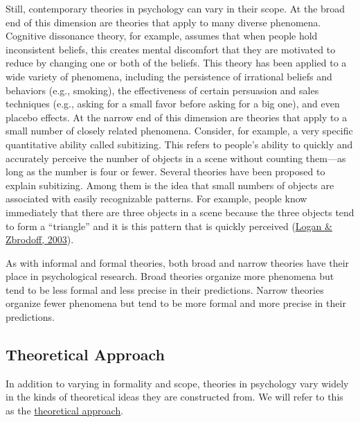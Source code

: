 \documentclass[
]{krantz}
\begin{document}
Still, contemporary theories in psychology can vary in their scope. At the broad end of this dimension are theories that apply to many diverse phenomena. Cognitive dissonance theory, for example, assumes that when people hold inconsistent beliefs, this creates mental discomfort that they are motivated to reduce by changing one or both of the beliefs. This theory has been applied to a wide variety of phenomena, including the persistence of irrational beliefs and behaviors (e.g., smoking), the effectiveness of certain persuasion and sales techniques (e.g., asking for a small favor before asking for a big one), and even placebo effects. At the narrow end of this dimension are theories that apply to a small number of closely related phenomena. Consider, for example, a very specific quantitative ability called subitizing. This refers to people's ability to quickly and accurately perceive the number of objects in a scene without counting them---as long as the number is four or fewer. Several theories have been proposed to explain subitizing. Among them is the idea that small numbers of objects are associated with easily recognizable patterns. For example, people know immediately that there are three objects in a scene because the three objects tend to form a ``triangle'' and it is this pattern that is quickly perceived (\protect\hyperlink{ref-logan2003subitizing}{Logan \& Zbrodoff, 2003}).

As with informal and formal theories, both broad and narrow theories have their place in psychological research. Broad theories organize more phenomena but tend to be less formal and less precise in their predictions. Narrow theories organize fewer phenomena but tend to be more formal and more precise in their predictions.

\hypertarget{theoretical-approach}{%
\subsection*{Theoretical Approach}\label{theoretical-approach}}


In addition to varying in formality and scope, theories in psychology vary widely in the kinds of theoretical ideas they are constructed from. We will refer to this as the \protect\hyperlink{theoretical-approach-1}{theoretical approach}.
\end{document}
